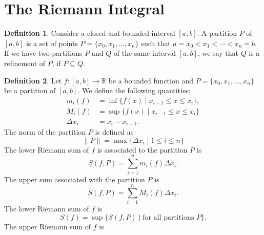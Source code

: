 \documentclass[12pt]{article}
\theoremstyle{definition}
\newtheorem{definition}{Definition}[section]
\theoremstyle{definition}
\begin{document}
    \section{The Riemann Integral}
    \begin{definition}
        Consider a closed and bounded interval $[a, b]$. A partition $P$ of
        $[a, b]$ is a set of points $P=\{x_0, x_1, \dots, x_n\}$ such that
        $a=x_0<x_1<\cdots<x_n=b$. If we have two partitions $P$ and $Q$ of the
        same interval $[a, b]$, we say that $Q$ is a refinement of $P$, if
        $P\subseteq Q$.
    \end{definition}
    \begin{definition}
        Let $f:[a, b]\to\mathbb{R}$ be a bounded function and $P=\{x_0, x_1,\dots, x_n\}$ 
        be a partition of $[a, b]$. We define the following
        quantities:
            \begin{equation*}
                \begin{split}
                    m_i(f)&=\inf \{f(x)\mid x_{i-1}\leq x\leq x_i\}, \\ 
                    M_i(f)&=\sup \{f(x)\mid x_{i-1}\leq x\leq x_i\} \\
                    \Delta x_i&= x_i-x_{i-1}.
                \end{split}
            \end{equation*}
        The norm of the partition $P$ is defined as 
            \begin{equation*}
                \|P\|=\max \{\Delta x_i\mid 1\leq i\leq n\} 
            \end{equation*}
        The lower Riemann sum of $f$ is associated to the partition $P$ is 
            \begin{equation*}
                \underline{S}(f, P)=\sum_{i=1}^{n}m_i(f)\Delta x_i.
            \end{equation*}
        The upper sum associated with the partition $P$ is 
            \begin{equation*}
                \overline{S}(f, P)=\sum_{i=1}^nM_i(f)\Delta x_i.
            \end{equation*}
        The lower Riemann sum of $f$ is 
            \begin{equation*}
                \underline{S}(f)=\sup \{\underline{S}(f, P)\mid\text{for all
                partitions $P$}\}.
            \end{equation*}
        The upper Riemann sum of $f$ is 
            \begin{equation*}

\end{equation*}
\end{definition}
\end{document}
